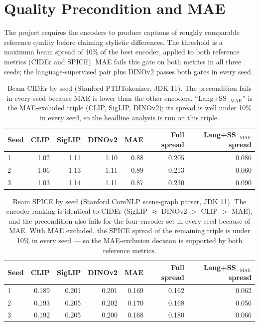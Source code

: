 \documentclass[11pt]{article}
\begin{document}
\section{Quality Precondition and MAE}

The project requires the encoders to produce captions of roughly comparable
reference quality before claiming stylistic differences. The threshold is a
maximum beam spread of 10\% of the best encoder, applied to both reference
metrics (CIDEr and SPICE). MAE fails this gate on both metrics in all three
seeds; the language-supervised pair plus DINOv2 passes both gates in every
seed.

\begin{table}[!htbp]
\centering
\caption{Beam CIDEr by seed (Stanford PTBTokenizer, JDK 11). The
precondition fails in every seed because MAE is lower than the other
encoders. ``Lang+SS\(_{-\text{MAE}}\)'' is the MAE-excluded triple (CLIP,
SigLIP, DINOv2); its spread is well under 10\% in every seed, so the
headline analysis is run on this triple.}
\label{tab:cider}
\begin{tabular}{@{}lrrrrrr@{}}
\toprule
Seed & CLIP & SigLIP & DINOv2 & MAE & Full spread & Lang+SS\(_{-\text{MAE}}\) spread \\
\midrule
1 & 1.02 & 1.11 & 1.10 & 0.88 & 0.205 & 0.086 \\
2 & 1.06 & 1.13 & 1.11 & 0.89 & 0.213 & 0.060 \\
3 & 1.03 & 1.14 & 1.11 & 0.87 & 0.230 & 0.090 \\
\bottomrule
\end{tabular}
\end{table}

\begin{table}[!htbp]
\centering
\caption{Beam SPICE by seed (Stanford CoreNLP scene-graph parser, JDK 11).
The encoder ranking is identical to CIDEr (SigLIP \(\approx\) DINOv2 \(>\) CLIP
\(>\) MAE), and the precondition also fails for the four-encoder set in every
seed because of MAE. With MAE excluded, the SPICE spread of the remaining
triple is under 10\% in every seed --- so the MAE-exclusion decision is
supported by both reference metrics.}
\label{tab:spice}
\begin{tabular}{@{}lrrrrrr@{}}
\toprule
Seed & CLIP & SigLIP & DINOv2 & MAE & Full spread & Lang+SS\(_{-\text{MAE}}\) spread \\
\midrule
1 & 0.189 & 0.201 & 0.201 & 0.169 & 0.162 & 0.062 \\
2 & 0.193 & 0.205 & 0.202 & 0.170 & 0.168 & 0.056 \\
3 & 0.192 & 0.205 & 0.200 & 0.168 & 0.180 & 0.066 \\
\bottomrule
\end{tabular}
\end{table}
\end{document}
